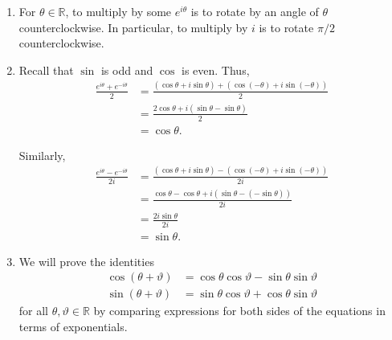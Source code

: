 \documentclass[12 pt, letterpaper]{hmcpset}
\begin{document}
\begin{solution}
\begin{enumerate}
			Each complex number with norm $1$ can be written as $\cos{\theta} + i \sin{\theta}$ for some real $\theta$, unique up to a multiple of $2 \pi$. In particular, for $z / \lvert z \rvert = (x + i y) / \lvert z \rvert$ we have $\cos{\theta} = x/\lvert z \rvert$ and $\sin{\theta} = y / \lvert z \rvert$. Thus, $\tan{\theta} = y / x$ and in the appropriate domain (where $x > 0$), we have $\theta = \arctan{(y / x)}$. 

			Thus, writing $z / \lvert z \rvert = \cos{\theta} + i \sin{\theta}$ for some $\theta \in \mathbb{R} / 2 \pi \mathbb{Z}$ and $r = \lvert z \rvert$ we have $z = r e^{i \theta}$ with the choice of real representative of $\theta$ unique up to a multiple of $2 \pi$.
		\item For $\theta \in \mathbb{R}$, to multiply by some $e^{i \theta}$ is to rotate by an angle of $\theta$ counterclockwise. In particular, to multiply by $i$ is to rotate $\pi / 2$ counterclockwise.
		\item Recall that $\sin$ is odd and $\cos$ is even. Thus,
			\begin{align*}
				\frac{e^{i\theta} + e^{-i \theta}}{2} & = \frac{(\cos{\theta} + i \sin{\theta}) + (\cos{(-\theta)} + i \sin{(-\theta)})}{2} \\
								      & = \frac{2 \cos{\theta} + i(\sin{\theta} - \sin{\theta})}{2} \\
								      & = \cos{\theta}.
			\end{align*}

			Similarly,
			\begin{align*}
				\frac{e^{i\theta} - e^{-i \theta}}{2 i} & = \frac{(\cos{\theta} + i \sin{\theta}) - (\cos{(-\theta)} + i \sin{(-\theta)})}{2 i} \\
								      & = \frac{\cos{\theta} - \cos{\theta} + i(\sin{\theta} - (- \sin{\theta}))}{2 i} \\
								      & = \frac{2 i \sin{\theta}}{2 i} \\
								      & = \sin{\theta}.
			\end{align*}
		\item We will prove the identities
			\begin{align*}
				\cos{(\theta + \vartheta)} & = \cos{\theta} \cos{\vartheta} - \sin{\theta}  \sin{\vartheta} \\
				\sin{(\theta + \vartheta)} & = \sin{\theta} \cos{\vartheta} + \cos{\theta} \sin{\vartheta}
			\end{align*}
			for all $\theta, \vartheta \in \mathbb{R}$ by comparing expressions for both sides of the equations in terms of exponentials.


\end{enumerate}
\end{solution}
\end{document}
